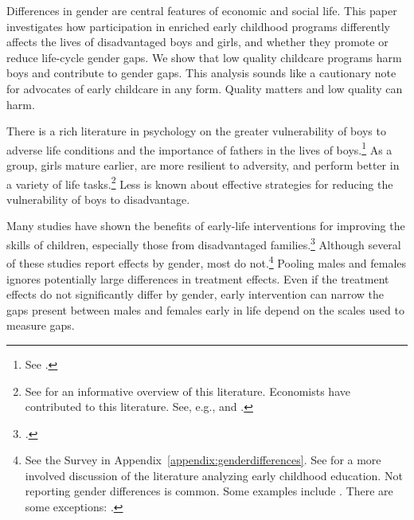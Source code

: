 Differences in gender are central features of economic and social life. This paper investigates how participation in enriched early childhood programs differently affects the lives of disadvantaged boys and girls, and whether they promote or reduce life-cycle gender gaps. We show that low quality childcare programs harm boys and contribute to gender gaps. This analysis sounds like a cautionary note for advocates of early childcare in any form. Quality matters and low quality can harm.

There is a rich literature in psychology on the greater vulnerability of boys to adverse life conditions and the importance of fathers in the lives of boys.\footnote{See \citet{golding2016psychology}.} As a group, girls mature earlier, are more resilient to adversity, and perform better in a variety of life tasks.\footnote{See \cite{Schore_2017_IMHJ} for an informative overview of this literature. Economists have contributed to this literature. See, e.g., \cite{Bertrand_Pan_2013_AEJAE,Autor-etal_2015_Family-Disadvantage} and \cite{Kottelenberg-Lehrer_2014_Gender-Effects}.} Less is known about effective strategies for reducing the vulnerability of boys to disadvantage.

Many studies have shown the benefits of early-life interventions for improving the skills of children, especially those from disadvantaged families.\footnote{\citet{Currie_2011_AER,Elango_Hojman_etal_2016_Early-Edu}.} Although several of these studies report effects by gender, most do not.\footnote{See the Survey in Appendix~\ref{appendix:genderdifferences}. See \citet{Elango_Hojman_etal_2016_Early-Edu} for a more involved discussion of the literature analyzing early childhood education. Not reporting gender differences is common. Some examples include \citet{Bernal_Keane_2011_JoLE,Cascio_Schanzenbach_2013_ImpactsExpandingAccess,Bitler_et_al_2014_Head_Start_Unpublished,Kline_Walters_2016_QJE}. There are some exceptions: \citet{Heckman_Moon_etal_2010_QE,Campbell_Conti_etal_2014_EarlyChildhoodInvestments,Garcia_Heckman_Leaf_etal_2017_Comp_CBA_Unpublished}.} Pooling males and females ignores potentially large differences in treatment effects. Even if the treatment effects do not significantly differ by gender, early intervention can narrow the gaps present between males and females early in life depend on the scales used to measure gaps.

